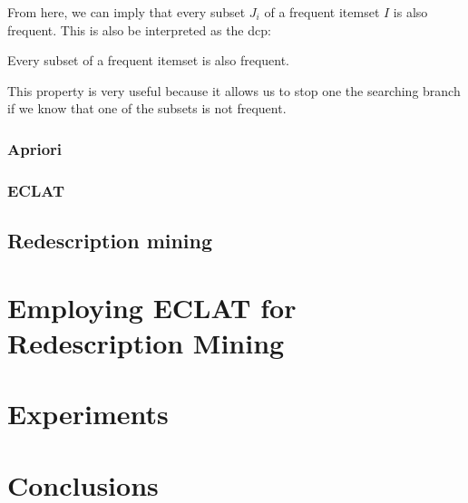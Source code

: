 From here, we can imply that every subset $J_i$ of a frequent itemset $I$ is also frequent.
This is also be interpreted as the \acl{dcp}:
\begin{definition}
    Every subset of a frequent itemset is also frequent.
\end{definition}
This property is very useful because it allows us to stop one the searching branch if we know that one of the subsets is not frequent.
\subsection{Apriori}
\subsection{ECLAT}

\section{Redescription mining}


\chapter{Employing ECLAT for Redescription Mining}
\label{cha:employment}

\chapter{Experiments}
\label{cha:experiments}

\chapter{Conclusions}
\label{cha:conclusions}